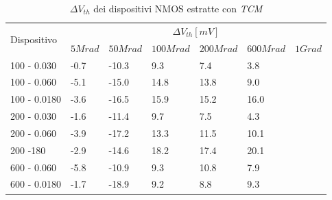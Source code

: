\documentclass[12pt, letterpaper]{book}
\begin{document}
\begin{table}[H]
  \renewcommand{\arraystretch}{1.3}
  \begin{tabular}{m{2.1cm}  m{1.1cm} m{1.3cm} m{1.5cm} m{1.5cm} m{1.5cm} m{1cm}}
    \toprule
    \multirow{2}{*}{Dispositivo} & \multicolumn{6}{c}{$\Delta V_{th} [mV] $}                                                          \\
    \cmidrule{2-7}
                                 & $5Mrad$                                   & $50Mrad$ & $100Mrad$ & $200Mrad$ & $600Mrad$ & $1Grad$ \\
    \midrule
    100 - 0.030                     & -0.7                                      & -10.3    & 9.3       & 7.4       & 3.8       &         \\
    \hline
    100 - 0.060                     & -5.1                                      & -15.0    & 14.8      & 13.8      & 9.0       &         \\
    \hline
    100 - 0.0180                    & -3.6                                      & -16.5    & 15.9      & 15.2      & 16.0      &         \\
    \hline
    200 - 0.030                     & -1.6                                      & -11.4    & 9.7       & 7.5       & 4.3       &         \\
    \hline
    200 - 0.060                     & -3.9                                      & -17.2    & 13.3      & 11.5      & 10.1      &         \\
    \hline
    200 -180                     & -2.9                                      & -14.6    & 18.2      & 17.4      & 20.1      &         \\
    \hline
    600 - 0.060                     & -5.8                                      & -10.9    & 9.3       & 10.8      & 7.9       &         \\
    \hline
    600 - 0.0180                    & -1.7                                      & -18.9    & 9.2       & 8.8       & 9.3       &         \\
    \bottomrule
  \end{tabular}
  \caption{$\Delta V_{th}$ dei dispositivi NMOS estratte con \emph{TCM}}
  \label{tab:deltaVthTCMN}
\end{table}
\end{document}
